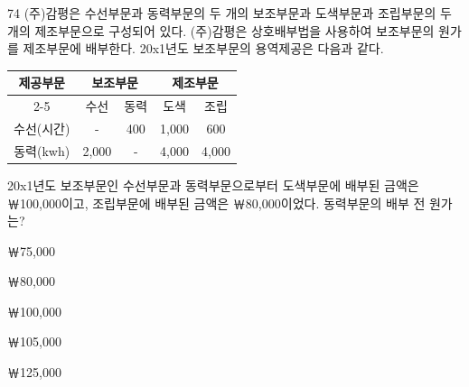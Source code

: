 \begin{question}{74}
(주)감평은 수선부문과 동력부문의 두 개의 보조부문과 도색부문과 조립부문의 두 개의 제조부문으로 구성되어 있다. (주)감평은 상호배부법을 사용하여 보조부문의 원가를 제조부문에 배부한다. 20x1년도 보조부문의 용역제공은 다음과 같다.
\par{\small\centering
\begin{tabular}{|c|c|c|c|c|}
\hline
\multirow{2}{*}{제공부문} & \multicolumn{2}{c|}{보조부문} & \multicolumn{2}{c|}{제조부문} \\ \cline{2-5}
 & 수선 & 동력 & 도색 & 조립 \\ \hline
수선(시간) & - & 400 & 1,000 & 600 \\ \hline
동력(kwh) & 2,000 & - & 4,000 & 4,000 \\ \hline
\end{tabular}\par}
20x1년도 보조부문인 수선부문과 동력부문으로부터 도색부문에 배부된 금액은 ￦100,000이고, 조립부문에 배부된 금액은 ￦80,000이었다. 동력부문의 배부 전 원가는? \par
\begin{choices}
  \item ￦75,000
  \item ￦80,000
  \item ￦100,000
  \item ￦105,000
  \item ￦125,000
\end{choices}
\end{question}

